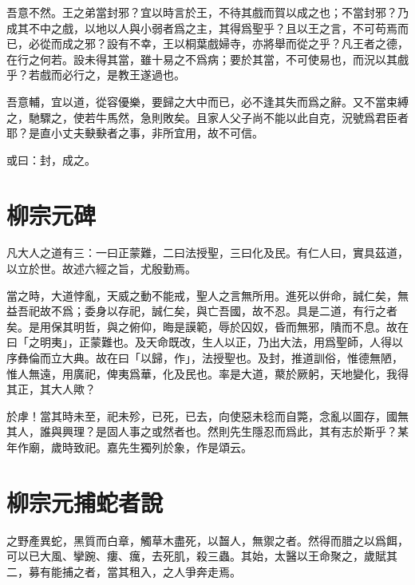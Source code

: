 吾意不然。王之弟當封邪？宜以時言於王，不待其戲而賀以成之也；不當封邪？乃成其不中之戲，以地以人與小弱者爲之主，其得爲聖乎？且以王之言，不可苟焉而已，必從而成之邪？設有不幸，王以桐葉戲婦寺，亦將舉而從之乎？凡王者之德，在行之何若。設未得其當，雖十易之不爲病；要於其當，不可使易也，而況以其戲乎？若戲而必行之，是教王遂過也。

吾意輔，宜以道，從容優樂，要歸之大中而已，必不逢其失而爲之辭。又不當束縛之，馳驟之，使若牛馬然，急則敗矣。且家人父子尚不能以此自克，況號爲君臣者耶？是直小丈夫{\selectfont 𡙇𡙇}者之事，非所宜用，故不可信。

或曰：封，成之。

\section[箕子碑\quad{\small 柳宗元}]{{\normalsize 柳宗元}\quad {}碑}
凡大人之道有三：一曰正蒙難，二曰法授聖，三曰化及民。有仁人曰，實具茲道，以立於世。故述六經之旨，尤殷勤焉。

當之時，大道悖亂，天威之動不能戒，聖人之言無所用。進死以倂命，誠仁矣，無益吾祀故不爲；委身以存祀，誠仁矣，與亡吾國，故不忍。具是二道，有行之者矣。是用保其明哲，與之俯仰，晦是謨範，辱於囚奴，昏而無邪，隤而不息。故在曰「之明夷」，正蒙難也。及天命既改，生人以正，乃出大法，用爲聖師，人得以序彝倫而立大典。故在曰「以歸，作」，法授聖也。及封，推道訓俗，惟德無陋，惟人無遠，用廣祀，俾夷爲華，化及民也。率是大道，藂於厥躬，天地變化，我得其正，其大人歟？

於虖！當其時未至，祀未殄，已死，已去，向使惡未稔而自斃，念亂以圖存，國無其人，誰與興理？是固人事之或然者也。然則先生隱忍而爲此，其有志於斯乎？某年作廟，歲時致祀。嘉先生獨列於象，作是頌云。


\section[捕蛇者說\quad{\small 柳宗元}]{{\normalsize 柳宗元}\quad 捕蛇者說}
之野產異蛇，黑質而白章，觸草木盡死，以齧人，無禦之者。然得而腊之以爲餌，可以已大風、攣踠、瘻、癘，去死肌，殺三蟲。其始，太醫以王命聚之，歲賦其二，募有能捕之者，當其租入，之人爭奔走焉。

